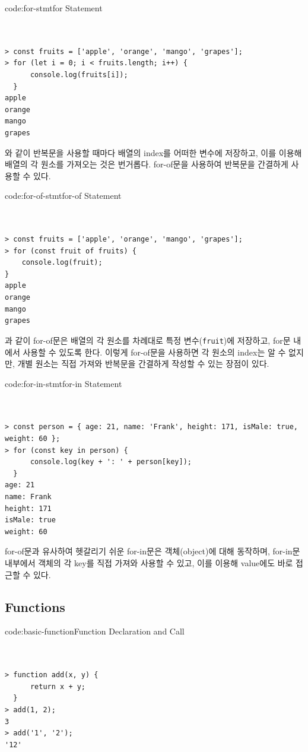 \begin{codeenv}{code:for-stmt}{for Statement}\begin{verbatim}


> const fruits = ['apple', 'orange', 'mango', 'grapes'];
> for (let i = 0; i < fruits.length; i++) {
      console.log(fruits[i]);
  }
apple
orange
mango
grapes
\end{verbatim}
\end{codeenv}

와 같이 반복문을 사용할 때마다 배열의 index를 어떠한 변수에 저장하고, 이를 이용해 배열의 각 원소를 가져오는 것은 번거롭다. for-of문을 사용하여 반복문을 간결하게 사용할 수 있다.

\begin{codeenv}{code:for-of-stmt}{for-of Statement}\begin{verbatim}


> const fruits = ['apple', 'orange', 'mango', 'grapes'];
> for (const fruit of fruits) {
    console.log(fruit);
}
apple
orange
mango
grapes
\end{verbatim}
\end{codeenv}

과 같이 for-of문은 배열의 각 원소를 차례대로 특정 변수(\texttt{fruit})에 저장하고, for문 내에서 사용할 수 있도록 한다. 이렇게 for-of문을 사용하면 각 원소의 index는 알 수 없지만, 개별 원소는 직접 가져와 반복문을 간결하게 작성할 수 있는 장점이 있다.

\begin{codeenv}{code:for-in-stmt}{for-in Statement}\begin{verbatim}


> const person = { age: 21, name: 'Frank', height: 171, isMale: true, weight: 60 };
> for (const key in person) {
      console.log(key + ': ' + person[key]);
  }
age: 21
name: Frank
height: 171
isMale: true
weight: 60
\end{verbatim}
\end{codeenv}

for-of문과 유사하여 헷갈리기 쉬운 for-in문은 객체(object)에 대해 동작하며, for-in문 내부에서 객체의 각 key를 직접 가져와 사용할 수 있고, 이를 이용해 value에도 바로 접근할 수 있다.

\subsection*{Functions}

\begin{codeenv}{code:basic-function}{Function Declaration and Call}\begin{verbatim}


> function add(x, y) {
      return x + y;
  }
> add(1, 2);
3
> add('1', '2');
'12'
\end{verbatim}
\end{codeenv}


